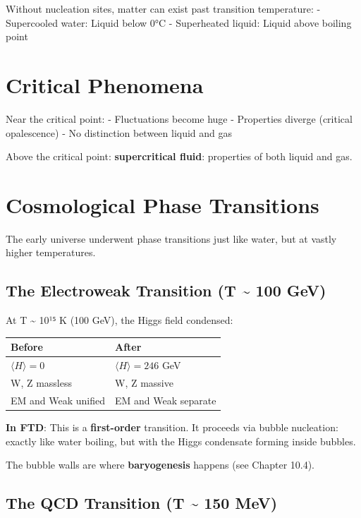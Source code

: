 \documentclass[
  11pt,
  letterpaper,
  twoside,
  openright]{book}
\begin{document}
Without nucleation sites, matter can exist past transition temperature:
- Supercooled water: Liquid below 0°C - Superheated liquid: Liquid above
boiling point

\section{Critical Phenomena}\label{critical-phenomena}

Near the critical point: - Fluctuations become huge - Properties diverge
(critical opalescence) - No distinction between liquid and gas

Above the critical point: \textbf{supercritical fluid}: properties of
both liquid and gas.

\section{Cosmological Phase
Transitions}\label{cosmological-phase-transitions}

The early universe underwent phase transitions just like water, but at
vastly higher temperatures.

\subsection{The Electroweak Transition (T \textasciitilde{} 100
GeV)}\label{the-electroweak-transition-t-100-gev}

At T \textasciitilde{} 10¹⁵ K (100 GeV), the Higgs field condensed:

\begin{longtable}[]{@{}ll@{}}
\toprule\noalign{}
Before & After \\
\midrule\noalign{}
\endhead
\bottomrule\noalign{}
\endlastfoot
\(\langle H \rangle = 0\) & \(\langle H \rangle = 246\) GeV \\
W, Z massless & W, Z massive \\
EM and Weak unified & EM and Weak separate \\
\end{longtable}

\textbf{In FTD}: This is a \textbf{first-order} transition. It proceeds
via bubble nucleation: exactly like water boiling, but with the Higgs
condensate forming inside bubbles.

The bubble walls are where \textbf{baryogenesis} happens (see Chapter
10.4).

\subsection{The QCD Transition (T \textasciitilde{} 150
MeV)}\label{the-qcd-transition-t-150-mev}
\end{document}
